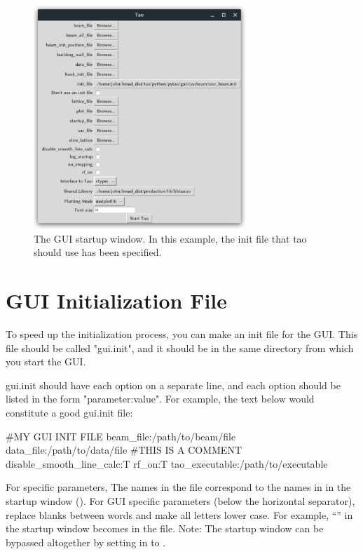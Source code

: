 \begin{figure}
\includegraphics[width=8cm]{figures/startup.pdf}
\centering
\caption[The GUI startup window.]{The GUI startup window. In this example, the init file that tao should use has been specified.}
\label{fig:startup}
\end{figure}

\section{GUI Initialization File}
\label{s:gui.init.file}

To speed up the initialization process, you can make an init file for the GUI.  This file should be called "gui.init", and it should be in the same directory from which you start the GUI.

gui.init should have each option on a separate line, and each option should be listed in the form "parameter:value".  For example, the text below would constitute a good gui.init file:
\begin{example}
  #MY GUI INIT FILE
  beam_file:/path/to/beam/file
  data_file:/path/to/data/file
  #THIS IS A COMMENT
  disable_smooth_line_calc:T
  rf_on:T
  tao_executable:/path/to/executable
\end{example}
For \tao specific parameters, The names in the  file correspond to the names in in the startup window
(). For GUI specific parameters (below the horizontal separator), replace blanks between words and
make all letters lower case. For example, ``'' in the startup window becomes 
in the  file. Note: The startup window can be bypassed altogether by setting  in 
to .

